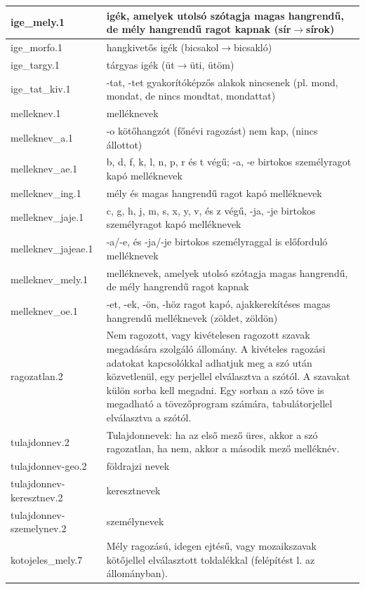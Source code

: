 \begin{longtable}[l]{lp{10cm}}
\\ \hline ige\_mely.1 & igék, amelyek utolsó szótagja magas hangrendű, de mély hangrendű ragot kapnak (sír$\rightarrow$sírok)
\\ \hline ige\_morfo.1 & hangkivetős igék (bicsakol$\rightarrow$bicsakló)
\\ \hline ige\_targy.1 & tárgyas igék (üt$\rightarrow$üti, ütöm)
\\ \hline ige\_tat\_kiv.1 & -tat, -tet gyakorítóképzős alakok nincsenek (pl. mond, mondat, de nincs mondtat, mondattat)
\\ \hline melleknev.1 & melléknevek
\\ \hline melleknev\_a.1 & -o kötőhangzót (főnévi ragozást) nem kap, (nincs állottot)
\\ \hline melleknev\_ae.1 & b, d, f, k, l, n, p, r és t végű; -a, -e birtokos személyragot kapó melléknevek
\\ \hline melleknev\_ing.1 & mély és magas hangrendű ragot kapó melléknevek
\\ \hline melleknev\_jaje.1 & c, g, h, j, m, s, x, y, v, és z végű, -ja, -je birtokos személyragot kapó melléknevek
\\ \hline melleknev\_jajeae.1 & -a/-e, és -ja/-je birtokos személyraggal is előforduló melléknevek
\\ \hline melleknev\_mely.1 & melléknevek, amelyek utolsó szótagja magas hangrendű, de mély hangrendű ragot kapnak
\\ \hline melleknev\_oe.1 & -et, -ek, -ön, -höz ragot kapó, ajakkerekítéses magas hangrendű melléknevek (zöldet, zöldön)
\\ \hline ragozatlan.2 & Nem ragozott, vagy kivételesen ragozott szavak megadására szolgáló állomány.
A kivételes ragozási adatokat kapcsolókkal adhatjuk meg a szó után közvetlenül, egy perjellel elválasztva
a szótól. A szavakat külön sorba kell megadni. Egy sorban a szó töve is megadható a
tövezőprogram számára, tabulátorjellel elválasztva a szótól.
\\ \hline tulajdonnev.2 & Tulajdonnevek: ha az első mező üres, akkor a szó ragozatlan, ha nem, akkor a második mező melléknév.
\\ \hline tulajdonnev-geo.2 & földrajzi nevek
\\ \hline tulajdonnev-keresztnev.2 & keresztnevek
\\ \hline tulajdonnev-szemelynev.2 & személynevek
\\ \hline kotojeles\_mely.7 & Mély ragozású, idegen ejtésű, vagy mozaikszavak kötőjellel elválasztott toldalékkal (felépítést l. az állományban).

\end{longtable}
